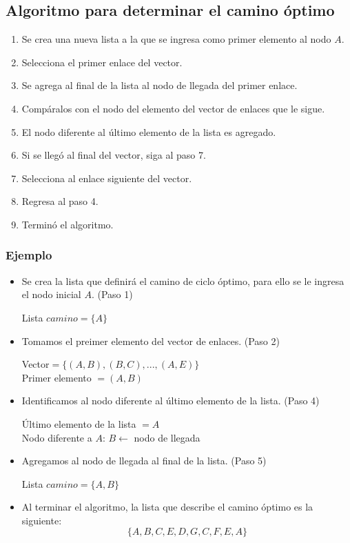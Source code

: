 \documentclass[12pt]{article}
\begin{document}
\subsection{Algoritmo para determinar el camino \'{o}ptimo}
\begin{enumerate}
\item Se crea una nueva lista a la que se ingresa como primer elemento al nodo $A$.
\item Selecciona el primer enlace del vector.
\item Se agrega al final de la lista al nodo de llegada del primer enlace.
\item Comp\'{a}ralos con el nodo del elemento del vector de enlaces que le sigue.
\item El nodo diferente al \'{u}ltimo elemento de la lista es agregado.
\item Si se lleg\'{o} al final del vector, siga al paso 7.
\item Selecciona al enlace siguiente del vector.
\item Regresa al paso 4.
\item Termin\'{o} el algoritmo.
\end{enumerate}
\pagebreak
\subsubsection{Ejemplo}
\begin{itemize}
\item Se crea la lista que definir\'{a} el camino de ciclo \'{o}ptimo, para ello se le ingresa el nodo inicial $A$. (Paso 1)
\begin{center}
Lista $camino=\{A\}$\\
\end{center}
\item Tomamos el preimer elemento del vector de enlaces. (Paso 2)
\begin{center}
Vector$=\{(A,B),(B,C),...,(A,E)\}$\\
Primer elemento $=(A,B)$\\
\end{center}
\item Identificamos al nodo diferente al \'{u}ltimo elemento de la lista. (Paso 4)
\begin{center}
\'{U}ltimo elemento de la lista $=A$\\
Nodo diferente a $A$: $B\leftarrow$ nodo de llegada\\
\end{center}
\item Agregamos al nodo de llegada al final de la lista. (Paso 5)
\begin{center}
Lista $camino=\{A,B\}$\\
\end{center}
\item Al terminar el algoritmo, la lista que describe el camino \'{o}ptimo es la siguiente:
$$\{A,B,C,E,D,G,C,F,E,A\}$$
\end{itemize}
\end{document}
